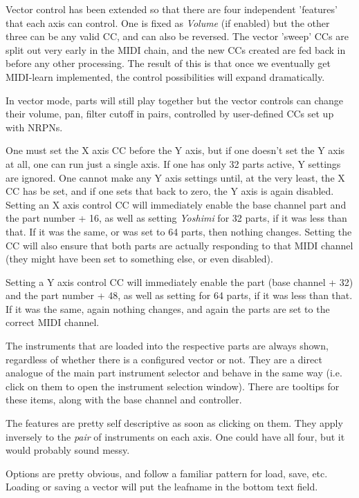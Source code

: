    Vector control has been extended so that there are four independent
   'features' that each axis can control. One is fixed as \textsl{Volume} (if
   enabled) but the other three can be any valid CC, and can also be reversed.
   The vector 'sweep' CCs are split out very early in the MIDI chain, and the
   new CCs created are fed back in before any other processing. The result of
   this is that once we eventually get MIDI-learn implemented, the control
   possibilities will expand dramatically.

   In vector mode, parts will still play together but the vector controls can
   change their volume, pan, filter cutoff in pairs, controlled by user-defined
   CCs set up with NRPNs.

   One must set the X axis CC before the Y axis, but if one doesn't set the Y
   axis at all, one can run just a single axis.  If one has only 32 parts
   active, Y settings are ignored.  One cannot make any Y axis settings until,
   at the very least, the X CC has be set, and if one sets that back to zero,
   the Y axis is again disabled.  Setting an X axis control CC will immediately
   enable the base channel part and the part number + 16, as well as setting
   \textsl{Yoshimi} for 32 parts, if it was less than that. If it was the same,
   or was set to 64 parts, then nothing changes. Setting the CC will also
   ensure that both parts are actually responding to that MIDI channel (they
   might have been set to something else, or even disabled).

   Setting a Y axis control CC will immediately enable the part (base channel +
   32) and the part number + 48, as well as setting for 64 parts, if it was
   less than that. If it was the same, again nothing changes, and again the
   parts are set to the correct MIDI channel.

   The instruments that are loaded into the respective parts are always shown,
   regardless of whether there is a configured vector or not. They are a direct
   analogue of the main part instrument selector and behave in the same way
   (i.e.  click on them to open the instrument selection window).  There are
   tooltips for these items, along with the base channel and controller.

   The features are pretty self descriptive as soon as clicking on them. They
   apply inversely to the \textsl{pair} of instruments on each axis.  One could
   have all four, but it would probably sound messy.

   Options are pretty obvious, and follow a familiar pattern for load, save,
   etc.  Loading or saving a vector will put the leafname in the bottom text
   field.

